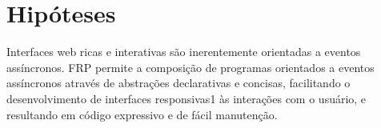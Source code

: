 \section{Hipóteses}\label{lhipotese}

Interfaces web ricas e interativas são inerentemente orientadas a eventos
assíncronos.
FRP permite a composição de programas orientados a eventos assíncronos através
de abstrações declarativas e concisas, facilitando o desenvolvimento de
interfaces responsivas1 às interações com o usuário, e resultando em código
expressivo e de fácil manutenção.

